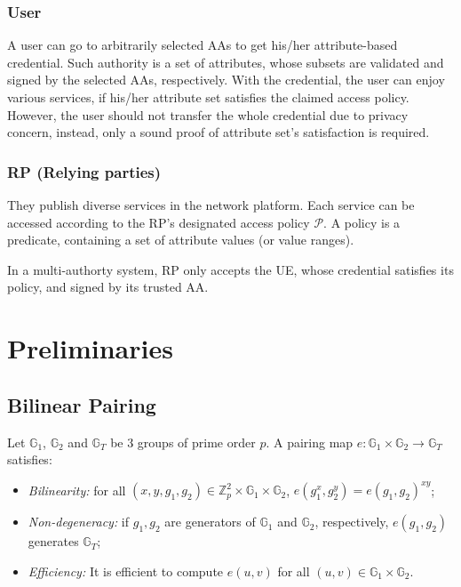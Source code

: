 \documentclass[journal]{IEEEtran}
\begin{document}
\subsubsection{User}
A user can go to arbitrarily selected AAs to get his/her attribute-based credential. Such authority is a set of attributes, whose subsets are validated and signed by the selected AAs, respectively. 
With the credential, the user can enjoy various services, if his/her attribute set satisfies the claimed access policy. However, the user should not transfer the whole credential due to privacy concern, instead, only a sound proof of attribute set's satisfaction is required.

\subsubsection{RP (Relying parties)}
They publish diverse services in the network platform. Each service can be accessed according to the RP's designated access policy $\mathcal{P}$. A policy is a predicate, containing a set of attribute values (or value ranges). 

In a multi-authorty system, RP only accepts the UE, whose credential satisfies its policy, and signed by its trusted AA.



\section{Preliminaries}\label{sec:pre}
\subsection{Bilinear Pairing}
Let $\mathbb{G}_1$, $\mathbb{G}_2$ and $\mathbb{G}_T$ be 3 groups of prime order $p$. A pairing map $e:\mathbb{G}_1\times \mathbb{G}_2\rightarrow\mathbb{G}_T$ satisfies:
\begin{itemize}
	\item \textit{Bilinearity:} for all $(x,y, g_1, g_2) \in \mathbb{Z}_p^2\times \mathbb{G}_1\times \mathbb{G}_2$, $e(g_1^x, g_2^y) = e(g_1, g_2)^{xy}$;
	\item \textit{Non-degeneracy:} if $g_1, g_2$ are generators of $\mathbb{G}_1$ and $\mathbb{G}_2$, respectively, $e(g_1, g_2)$ generates $\mathbb{G}_T$;
	\item \textit{Efficiency:} It is efficient to compute $e(u,v)$ for all $(u, v) \in \mathbb{G}_1\times \mathbb{G}_2$.
\end{itemize}
\end{document}
